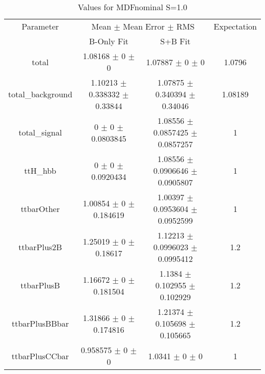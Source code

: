 \begin{table}
\centering
\caption{Values for MDFnominal S=1.0}
\begin{tabular}{cccc}
\toprule
Parameter & \multicolumn{2}{c}{Mean $\pm$ Mean Error $\pm$ RMS} & Expectation\\
 & B-Only Fit & S+B Fit & \\
\midrule
total & \num{1.08168} $\pm$ \num{0} $\pm$ \num{0} & \num{1.07887} $\pm$ \num{0} $\pm$ \num{0} & \num{1.0796}\\
total\_background & \num{1.10213} $\pm$ \num{0.338332} $\pm$ \num{0.33844} & \num{1.07875} $\pm$ \num{0.340394} $\pm$ \num{0.34046} & \num{1.08189}\\
total\_signal & \num{0} $\pm$ \num{0} $\pm$ \num{0.0803845} & \num{1.08556} $\pm$ \num{0.0857425} $\pm$ \num{0.0857257} & \num{1}\\
ttH\_hbb & \num{0} $\pm$ \num{0} $\pm$ \num{0.0920434} & \num{1.08556} $\pm$ \num{0.0906646} $\pm$ \num{0.0905807} & \num{1}\\
ttbarOther & \num{1.00854} $\pm$ \num{0} $\pm$ \num{0.184619} & \num{1.00397} $\pm$ \num{0.0953604} $\pm$ \num{0.0952599} & \num{1}\\
ttbarPlus2B & \num{1.25019} $\pm$ \num{0} $\pm$ \num{0.18617} & \num{1.12213} $\pm$ \num{0.0996023} $\pm$ \num{0.0995412} & \num{1.2}\\
ttbarPlusB & \num{1.16672} $\pm$ \num{0} $\pm$ \num{0.181504} & \num{1.1384} $\pm$ \num{0.102955} $\pm$ \num{0.102929} & \num{1.2}\\
ttbarPlusBBbar & \num{1.31866} $\pm$ \num{0} $\pm$ \num{0.174816} & \num{1.21374} $\pm$ \num{0.105698} $\pm$ \num{0.105665} & \num{1.2}\\
ttbarPlusCCbar & \num{0.958575} $\pm$ \num{0} $\pm$ \num{0} & \num{1.0341} $\pm$ \num{0} $\pm$ \num{0} & \num{1}\\
\bottomrule
\end{tabular}
\end{table}